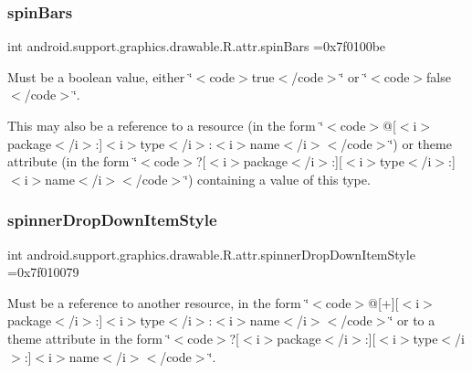 \subsubsection{\texorpdfstring{spin\+Bars}{spinBars}}
{\footnotesize\ttfamily int android.\+support.\+graphics.\+drawable.\+R.\+attr.\+spin\+Bars =0x7f0100be\hspace{0.3cm}{\ttfamily [static]}}

Must be a boolean value, either \char`\"{}$<$code$>$true$<$/code$>$\char`\"{} or \char`\"{}$<$code$>$false$<$/code$>$\char`\"{}. 

This may also be a reference to a resource (in the form \char`\"{}$<$code$>$@\mbox{[}$<$i$>$package$<$/i$>$\+:\mbox{]}$<$i$>$type$<$/i$>$\+:$<$i$>$name$<$/i$>$$<$/code$>$\char`\"{}) or theme attribute (in the form \char`\"{}$<$code$>$?\mbox{[}$<$i$>$package$<$/i$>$\+:\mbox{]}\mbox{[}$<$i$>$type$<$/i$>$\+:\mbox{]}$<$i$>$name$<$/i$>$$<$/code$>$\char`\"{}) containing a value of this type. \mbox{\label{classandroid_1_1support_1_1graphics_1_1drawable_1_1R_1_1attr_ab4e68297eced040c3db6fb7bf2a4e867}} 
\subsubsection{\texorpdfstring{spinner\+Drop\+Down\+Item\+Style}{spinnerDropDownItemStyle}}
{\footnotesize\ttfamily int android.\+support.\+graphics.\+drawable.\+R.\+attr.\+spinner\+Drop\+Down\+Item\+Style =0x7f010079\hspace{0.3cm}{\ttfamily [static]}}

Must be a reference to another resource, in the form \char`\"{}$<$code$>$@\mbox{[}+\mbox{]}\mbox{[}$<$i$>$package$<$/i$>$\+:\mbox{]}$<$i$>$type$<$/i$>$\+:$<$i$>$name$<$/i$>$$<$/code$>$\char`\"{} or to a theme attribute in the form \char`\"{}$<$code$>$?\mbox{[}$<$i$>$package$<$/i$>$\+:\mbox{]}\mbox{[}$<$i$>$type$<$/i$>$\+:\mbox{]}$<$i$>$name$<$/i$>$$<$/code$>$\char`\"{}. \mbox{\label{classandroid_1_1support_1_1graphics_1_1drawable_1_1R_1_1attr_aaa7e0fb24624790cb46477ebd5ed558b}} 
